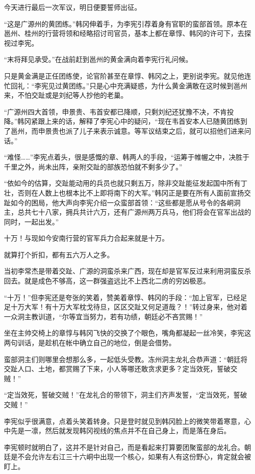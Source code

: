 今天进行最后一次军议，明日便要誓师出征。

“这是广源州的黄团练。”韩冈伸着手，为李宪引荐着身有官职的蛮部首领。原本在邕州、桂州的行营将领和经略招讨司官员，基本上都在章惇、韩冈的许可下，去探视过李宪。

“末将拜见承受。”在战前赶到邕州的黄金满向着李宪行礼问候。

只是黄金满是正任团练使，论官阶甚至在章惇、韩冈之上，更别说李宪。就见他连忙回礼：“李宪见过黄团练。”只是心中充满疑惑，为什么黄金满敢在这时候到邕州来，不怕交趾或是刘纪等人抄他的老巢。

“广源州四大首领，申景贵、韦首安都已降顺，只剩刘纪还犹豫不决，不肯投降。”韩冈紧跟上来的话，解释了李宪心中的疑问，“现在韦首安本人已随黄团练到了邕州，而申景贵也派了儿子来表示诚意。等军议结束之后，就可以招他们进来问话。”

“难怪……”李宪点着头，很是感慨的章、韩两人的手段，“运筹于帷幄之中，决胜于千里之外，尚未出阵，亲附交趾的部族恐怕就不剩多少了。”

“依如今的估算，交趾能动用的兵员也就只剩五万，除非交趾能征发起国中所有丁壮，否则在人数上也根本比不上即将南下的大军。”韩冈正是要在所有人面前宣扬交趾如今的困局，他大声向李宪介绍一众蛮部首领：“这些都是愿从号令的各峒洞主，总共七十八家，拥兵共计六万，还有广源州两万兵马，他们将会在官军出战的同时，一起出发。”

十万！与现如今安南行营的官军兵力合起来就是十万。

就算打个折扣，都有五六万人之多。

当初李常杰是带着交趾、广源的洞蛮杀来广西，现在却是官军反过来利用洞蛮反杀回去。就是成色不够高，这一群强盗远比不上西北二虏的穷凶极恶。

“十万！”但李宪还是夸张的笑着，赞美着章惇、韩冈的手段：“加上官军，已经足足十万大军！有十万大军枕戈待旦，区区交趾又何足道哉？！”转过身来，他对着一众洞主教训道，“尔等宜当努力，若有功绩，朝廷必不吝赏赐！”

坐在主帅交椅上的章惇与韩冈飞快的交换了个眼色，嘴角都凝起一丝冷笑，李宪这两句训话，是趁机在帐中确立自己的地位，倒是会借势。

蛮部洞主们则哪里会想那么多，一起低头受教。冻州洞主龙礼合恭声道：“朝廷将交趾人口、土地，都赏赐了下来，小人等哪还敢贪求更多？定当效死，誓破交贼！”

“定当效死，誓破交贼！”在龙礼合的带领下，洞主们齐声发誓，“定当效死，誓破交贼！”

李宪似乎很满意，点着头笑着转身。只是登时就见到韩冈脸上的微笑带着寒意，心中先是一凛，然后就发现韩冈视线的焦点并不在自己身上，而是落在身后。

李宪顿时就明白了，这并不是针对自己，而是看起来打算要团聚蛮部的龙礼合。朝廷是不会允许左右江三十六峒中出现一个核心，如果有人有这份野心，肯定就会被盯上。

